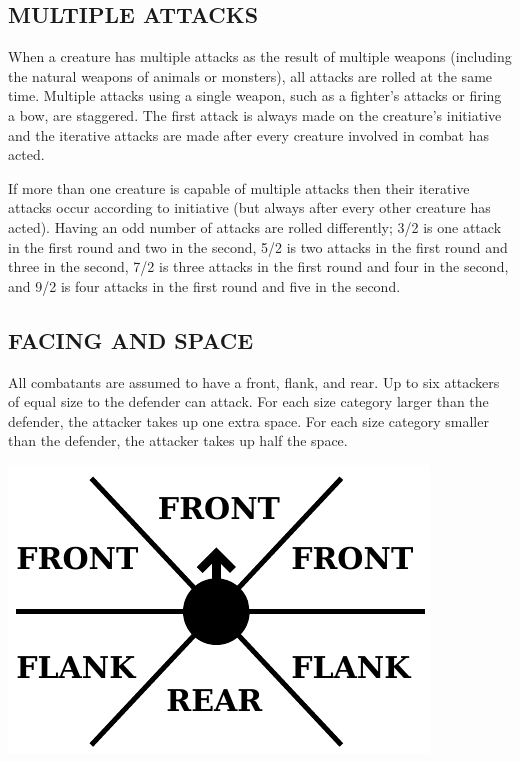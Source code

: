 \begin{multicols}{2}
\begin{minipage}{\columnwidth}
\end{minipage}

\subsection{MULTIPLE ATTACKS}

When a creature has multiple attacks as the result of multiple weapons (including the natural weapons of animals or monsters), all attacks are rolled at the same time.  Multiple attacks using a single weapon, such as a fighter's attacks or firing a bow, are staggered.  The first attack is always made on the creature's initiative and the iterative attacks are made after every creature involved in combat has acted.  

If more than one creature is capable of multiple attacks then their iterative attacks occur according to initiative (but always after every other creature has acted).  Having an odd number of attacks are rolled differently; 3/2 is one attack in the first round and two in the second, 5/2 is two attacks in the first round and three in the second, 7/2 is three attacks in the first round and four in the second, and 9/2 is four attacks in the first round and five in the second.  

\subsection{FACING AND SPACE}

All combatants are assumed to have a front, flank, and rear.  Up to six attackers of equal size to the defender can attack.  For each size category larger than the defender, the attacker takes up one extra space.  For each size category smaller than the defender, the attacker takes up half the space.

\noindent
\begin{minipage}{\columnwidth}

\noindent\includegraphics[width=\columnwidth]{facing.pdf}


\end{minipage}
\end{multicols}
